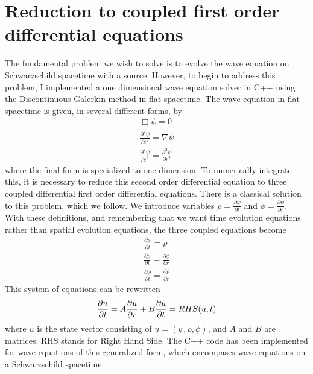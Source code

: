 \section{Reduction to coupled first order differential equations}

The fundamental problem we wish to solve is to evolve the wave equation on Schwarzschild spacetime with a source. However, to begin to address this problem, I implemented a one dimensional wave equation solver in C++ using the Discontinuous Galerkin method in flat spacetime. The wave equation in flat spacetime is given, in several different forms, by
\begin{eqnarray}
  \Box\psi=0\\
  \frac{\partial^2\psi}{\partial t^2}=\nabla\psi\\
  \frac{\partial^2\psi}{\partial t^2}=\frac{\partial^2 \psi}{\partial r^2}
\end{eqnarray}
where the final form is specialized to one dimension. To numerically integrate this, it is necessary to reduce this second order differential equation to three coupled differential first order differential equations. There is a classical solution to this problem, which we follow. We introduce variables $\rho=\frac{\partial \psi}{\partial t}$ and $\phi = \frac{\partial\psi}{\partial r}$. With these definitions, and remembering that we want time evolution equations rather than spatial evolution equations, the three coupled equations become
\begin{eqnarray}
  \frac{\partial\psi}{\partial t} = \rho\\
  \frac{\partial\rho}{\partial t} = \frac{\partial \phi}{\partial r}\\
  \frac{\partial\phi}{\partial t} = \frac{\partial \rho}{\partial r}
\end{eqnarray}
This system of equations can be rewritten
\begin{equation}
  \frac{\partial u}{\partial t} = A\frac{\partial u}{\partial r} + B\nonumber\\
  \frac{\partial u}{\partial t} = RHS(u,t)
  \label{matrixdiff}
\end{equation}
where $u$ is the state vector consisting of $u=(\psi,\rho,\phi)$, and $A$ and $B$ are matrices. RHS stands for Right Hand Side. The C++ code has been implemented for wave equations of this generalized form, which encompases wave equations on a Schwarzschild spacetime.



